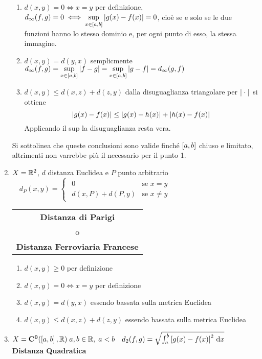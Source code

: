 \begin{example}
\begin{enumerate}
\begin{enumerate}[label=\arabic*.]
				\item $d(x,y) = 0 \iff x = y$ per definizione, $d_\infty(f,g) = 0 \iff \sup\limits_{x\in\left[a,b\right]}\left|g(x)-f(x)\right| = 0$, cioè se e solo se le due funzioni hanno lo stesso dominio e, per ogni punto di esso, la stessa immagine.
				\item $d(x,y)=d(y,x)$ semplicmente $d_{\infty}(f,g) = \sup\limits_{x\in\left[a,b\right]}\left|f-g\right| = \sup\limits_{x\in\left[a,b\right]}\left|g-f\right| = d_{\infty}(g,f)$
				\item $d(x,y) \leq d(x,z) + d(z,y)$ dalla disuguaglianza triangolare per $\left|\;\cdot\;\right|$ si ottiene
					$$\left|g(x)-f(x)\right|\le\left|g(x)-h(x)\right|+\left|h(x)-f(x)\right|$$
					Applicando il sup la disuguaglianza resta vera.
			\end{enumerate}
			\begin{note}
				Si sottolinea che queste conclusioni sono valide finché $\left[a,b\right]$ chiuso e limitato, altrimenti non varrebbe più il  necessario per il punto 1. %
			\end{note}
		\item $X=\mathbb{R}^2$, $d$ distanza Euclidea e $P$ punto arbitrario\newline
			$\quad d_P(x,y)=
			\begin{cases}
				\begin{array}{ll}
					0 & \text{se } x = y\\
					d(x,P) + d(P,y) & \text{se } x \neq y
				\end{array}
			\end{cases}$ \hfill
			{\footnotesize
				\begin{tabular}{c}
					\textbf{Distanza di Parigi}\\
					o\\
					\textbf{Distanza Ferroviaria Francese}
				\end{tabular}
			} \label{ex:dist_parigi}
			\begin{enumerate}[label=\arabic*.]
				\item $d(x,y) \geq 0$ per definizione
				\item $d(x,y) = 0 \iff x = y$ per definizione
				\item $d(x,y)=d(y,x)$ essendo bassata sulla metrica Euclidea
				\item $d(x,y) \leq d(x,z) + d(z,y)$ essendo bassata sulla metrica Euclidea
			\end{enumerate}
		\item $X=\mathbf{C^{0}}(\left[a,b\right],\mathbb{R})\;a,b\in\mathbb{R},\;a<b \quad d_2(f,g) = \sqrt{\int_a^b\left[g(x)-f(x)\right]^2 \,\mathrm{d}{x}}$ \hfill {\footnotesize\textbf{Distanza Quadratica}}

\end{enumerate}
\end{example}
